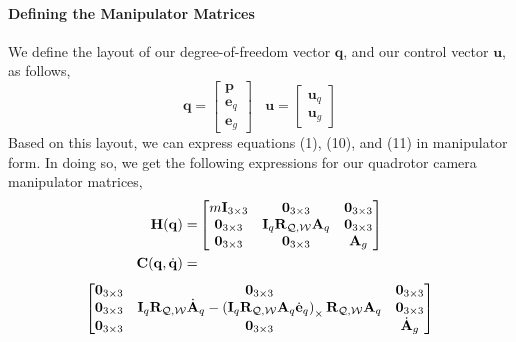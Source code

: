 \paragraph{Defining the Manipulator Matrices}
We define the layout of our degree-of-freedom vector $\mathbf{q}$, and our control vector $\mathbf{u}$, as follows,
%
\footnotesize
\begin{equation}
\mathbf{q} = 
\begin{bmatrix}
\mathbf{p} \\
\mathbf{e}_q \\
\mathbf{e}_g
\end{bmatrix}
%
~~~~
\mathbf{u} = 
\begin{bmatrix}
\mathbf{u}_q \\
\mathbf{u}_g
\end{bmatrix}
\end{equation}
\normalsize
%
Based on this layout, we can express equations (1), (10), and (11) in manipulator form.
In doing so, we get the following expressions for our quadrotor camera manipulator matrices,
%
\footnotesize
\begin{equation}
\begin{aligned}
\mathbf{H}(\mathbf{q}) = &
\begin{bmatrix}
m\mathbf{I}_{3\times3} & \mathbf{0}_{3\times3} & \mathbf{0}_{3\times3} \\
\mathbf{0}_{3\times3}                          & \mathbf{I}_{q} \mathbf{R}_{\mathcal{Q},\mathcal{W}} \mathbf{A}_q & \mathbf{0}_{3\times3} \\
\mathbf{0}_{3\times3}                          & \mathbf{0}_{3\times3} & \mathbf{A}_{g}
\end{bmatrix} \\
%
\mathbf{C}(\mathbf{q},\dot{\mathbf{q}}) = &
\end{aligned} \notag
\end{equation}
%
\vspace{-3pt}
\begin{equation}
\begin{aligned}
\begin{bmatrix}
\mathbf{0}_{3\times3} & \mathbf{0}_{3\times3}  & \mathbf{0}_{3\times3} \\
\mathbf{0}_{3\times3} & \mathbf{I}_q \mathbf{R}_{\mathcal{Q},\mathcal{W}} \dot{\mathbf{A}}_q - \left(\mathbf{I}_q \mathbf{R}_{\mathcal{Q},\mathcal{W}} \mathbf{A}_q \dot{\mathbf{e}}_q \right)_{\times}\mathbf{R}_{\mathcal{Q},\mathcal{W}} \mathbf{A}_q & \mathbf{0}_{3\times3} \\
\mathbf{0}_{3\times3} & \mathbf{0}_{3\times3}  & \dot{\mathbf{A}}_g
\end{bmatrix}
\end{aligned} \notag
\end{equation}
